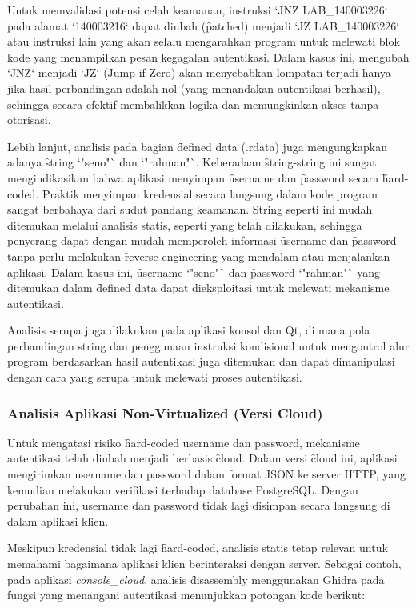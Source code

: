 Untuk memvalidasi potensi celah keamanan, instruksi `JNZ LAB\_140003226` pada alamat `140003216` dapat diubah (\f{patched}) menjadi `JZ LAB\_140003226` atau instruksi lain yang akan selalu mengarahkan program untuk melewati blok kode yang menampilkan pesan kegagalan autentikasi. Dalam kasus ini, mengubah `JNZ` menjadi `JZ` (Jump if Zero) akan menyebabkan lompatan terjadi hanya jika hasil perbandingan adalah nol (yang menandakan autentikasi berhasil), sehingga secara efektif membalikkan logika dan memungkinkan akses tanpa otorisasi.

Lebih lanjut, analisis pada bagian \f{defined data} (.rdata) juga mengungkapkan adanya \f{string} `"seno"` dan `"rahman"`. Keberadaan \f{string-string} ini sangat mengindikasikan bahwa aplikasi menyimpan \f{username} dan \f{password} secara \f{hard-coded}. Praktik menyimpan kredensial secara langsung dalam kode program sangat berbahaya dari sudut pandang keamanan. String seperti ini mudah ditemukan melalui analisis statis, seperti yang telah dilakukan, sehingga penyerang dapat dengan mudah memperoleh informasi \f{username} dan \f{password} tanpa perlu melakukan \f{reverse engineering} yang mendalam atau menjalankan aplikasi. Dalam kasus ini, \f{username} `"seno"` dan \f{password} `"rahman"` yang ditemukan dalam \f{defined data} dapat dieksploitasi untuk melewati mekanisme autentikasi.

Analisis serupa juga dilakukan pada aplikasi konsol dan Qt, di mana pola perbandingan string dan penggunaan instruksi kondisional untuk mengontrol alur program berdasarkan hasil autentikasi juga ditemukan dan dapat dimanipulasi dengan cara yang serupa untuk melewati proses autentikasi.

\subsubsection{Analisis Aplikasi Non-Virtualized (Versi Cloud)}
Untuk mengatasi risiko \f{hard-coded} username dan password, mekanisme autentikasi telah diubah menjadi berbasis \f{cloud}. Dalam versi \f{cloud} ini, aplikasi mengirimkan username dan password dalam format JSON ke server HTTP, yang kemudian melakukan verifikasi terhadap database PostgreSQL. Dengan perubahan ini, username dan password tidak lagi disimpan secara langsung di dalam aplikasi klien.

Meskipun kredensial tidak lagi \f{hard-coded}, analisis statis tetap relevan untuk memahami bagaimana aplikasi klien berinteraksi dengan server. Sebagai contoh, pada aplikasi \textit{console\_cloud}, analisis \f{disassembly} menggunakan Ghidra pada fungsi yang menangani autentikasi menunjukkan potongan kode berikut:

